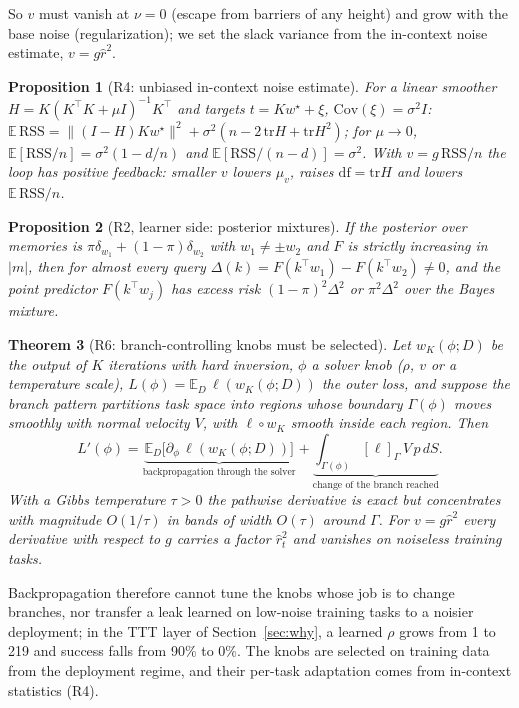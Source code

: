 \documentclass{article}
\newtheorem{theorem}{Theorem}
\newtheorem{proposition}[theorem]{Proposition}
\theoremstyle{definition}
\theoremstyle{remark}
\newcommand{\Ex}{\mathbb{E}}
\newcommand{\RSSx}{\mathrm{RSS}}
\newcommand{\dof}{\mathrm{df}}
\begin{document}
So $v$ must vanish at $\nu=0$ (escape from barriers of any height) and grow with the base noise (regularization); we set the slack variance from the in-context noise estimate, $v=g\hat r^2$.

\begin{proposition}[R4: unbiased in-context noise estimate]
\label{prop:l3}
For a linear smoother $H=K(K^\top K+\mu I)^{-1}K^\top$ and targets $t=Kw^\star+\xi$, $\mathrm{Cov}(\xi)=\sigma^2I$:
$\Ex\,\RSSx=\|(I-H)Kw^\star\|^2+\sigma^2(n-2\,\mathrm{tr}H+\mathrm{tr}H^2)$; for $\mu\to0$, $\Ex[\RSSx/n]=\sigma^2(1-d/n)$ and $\Ex[\RSSx/(n-d)]=\sigma^2$.
With $v=g\,\RSSx/n$ the loop has positive feedback: smaller $v$ lowers $\mu_v$, raises $\dof=\mathrm{tr}H$ and lowers $\Ex\,\RSSx/n$.
\end{proposition}

\begin{proposition}[R2, learner side: posterior mixtures]
\label{prop:l4}
If the posterior over memories is $\pi\delta_{w_1}+(1-\pi)\delta_{w_2}$ with $w_1\neq\pm w_2$ and $F$ is strictly increasing in $|m|$, then for almost every query $\Delta(k)=F(k^\top w_1)-F(k^\top w_2)\neq0$, and the point predictor $F(k^\top w_j)$ has excess risk $(1-\pi)^2\Delta^2$ or $\pi^2\Delta^2$ over the Bayes mixture.
\end{proposition}

\begin{theorem}[R6: branch-controlling knobs must be selected]
\label{thm:l5}
Let $w_K(\phi;D)$ be the output of $K$ iterations with hard inversion, $\phi$ a solver knob ($\rho$, $v$ or a temperature scale), $L(\phi)=\Ex_D\,\ell(w_K(\phi;D))$ the outer loss, and suppose the branch pattern partitions task space into regions whose boundary $\Gamma(\phi)$ moves smoothly with normal velocity $V$, with $\ell\circ w_K$ smooth inside each region. Then
\begin{equation}
L'(\phi)=\underbrace{\Ex_D\big[\partial_\phi\,\ell(w_K(\phi;D))\big]}_{\text{backpropagation through the solver}}+\underbrace{\int_{\Gamma(\phi)}[\ell]_\Gamma\,V\,p\,dS}_{\text{change of the branch reached}}.
\end{equation}
With a Gibbs temperature $\tau>0$ the pathwise derivative is exact but concentrates with magnitude $O(1/\tau)$ in bands of width $O(\tau)$ around $\Gamma$. For $v=g\hat r^2$ every derivative with respect to $g$ carries a factor $\hat r_t^2$ and vanishes on noiseless training tasks.
\end{theorem}

Backpropagation therefore cannot tune the knobs whose job is to change branches, nor transfer a leak learned on low-noise training tasks to a noisier deployment; in the TTT layer of Section~\ref{sec:why}, a learned $\rho$ grows from 1 to 219 and success falls from 90\% to 0\%.
The knobs are selected on training data from the deployment regime, and their per-task adaptation comes from in-context statistics (R4).
\end{document}
